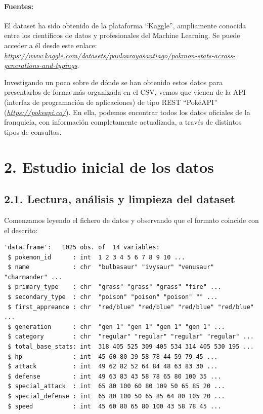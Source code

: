 \documentclass[
  12pt,
]{extreport}
\begin{document}
\subsubsection{Fuentes:}\label{fuentes}

El dataset ha sido obtenido de la plataforma ``Kaggle'', ampliamente
conocida entre los científicos de datos y profesionales del Machine
Learning. Se puede acceder a él desde este enlace:
\href{https://www.kaggle.com/datasets/pauloarayasantiago/pokmon-stats-across-generations-and-typings}{\emph{https://www.kaggle.com/datasets/pauloarayasantiago/pokmon-stats-across-generations-and-typings}}.

Investigando un poco sobre de dónde se han obtenido estos datos para
presentarlos de forma más organizada en el CSV, vemos que vienen de la
API (interfaz de programación de aplicaciones) de tipo REST ``PokéAPI''
(\href{https://pokeapi.co/}{\emph{https://pokeapi.co/}}). En ella,
podemos encontrar todos los datos oficiales de la franquicia, con
información completamente actualizada, a través de distintos tipos de
consultas.

\chapter{2. Estudio inicial de los
datos}\label{estudio-inicial-de-los-datos}

\section{2.1. Lectura, análisis y limpieza del
dataset}\label{lectura-anuxe1lisis-y-limpieza-del-dataset}

Comenzamos leyendo el fichero de datos y observando que el formato
coincide con el descrito:

\begin{verbatim}
'data.frame':   1025 obs. of  14 variables:
 $ pokemon_id      : int  1 2 3 4 5 6 7 8 9 10 ...
 $ name            : chr  "bulbasaur" "ivysaur" "venusaur" "charmander" ...
 $ primary_type    : chr  "grass" "grass" "grass" "fire" ...
 $ secondary_type  : chr  "poison" "poison" "poison" "" ...
 $ first_appreance : chr  "red/blue" "red/blue" "red/blue" "red/blue" ...
 $ generation      : chr  "gen 1" "gen 1" "gen 1" "gen 1" ...
 $ category        : chr  "regular" "regular" "regular" "regular" ...
 $ total_base_stats: int  318 405 525 309 405 534 314 405 530 195 ...
 $ hp              : int  45 60 80 39 58 78 44 59 79 45 ...
 $ attack          : int  49 62 82 52 64 84 48 63 83 30 ...
 $ defense         : int  49 63 83 43 58 78 65 80 100 35 ...
 $ special_attack  : int  65 80 100 60 80 109 50 65 85 20 ...
 $ special_defense : int  65 80 100 50 65 85 64 80 105 20 ...
 $ speed           : int  45 60 80 65 80 100 43 58 78 45 ...
\end{verbatim}
\end{document}
